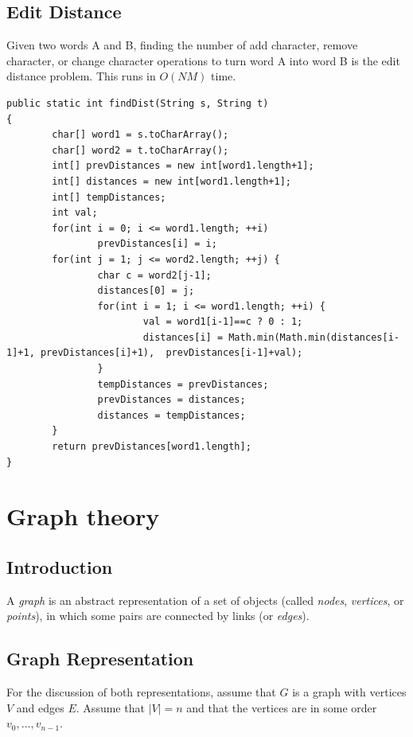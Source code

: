 \documentclass[a4paper,12pt]{article}
\begin{document}
\subsection{Edit Distance}

Given two words A and B, finding the number of add character, remove character, or change character operations to turn word A into word B is the edit distance problem. This runs in $O(NM)$ time.

\begin{lstlisting}
public static int findDist(String s, String t) 
{                
        char[] word1 = s.toCharArray();
        char[] word2 = t.toCharArray();
        int[] prevDistances = new int[word1.length+1];
        int[] distances = new int[word1.length+1];
        int[] tempDistances;
        int val;
        for(int i = 0; i <= word1.length; ++i) 
                prevDistances[i] = i;
        for(int j = 1; j <= word2.length; ++j) {
                char c = word2[j-1];
                distances[0] = j;
                for(int i = 1; i <= word1.length; ++i) {
                        val = word1[i-1]==c ? 0 : 1;                            
                        distances[i] = Math.min(Math.min(distances[i-1]+1, prevDistances[i]+1),  prevDistances[i-1]+val);  
                }
                tempDistances = prevDistances;
                prevDistances = distances;
                distances = tempDistances;
        } 
        return prevDistances[word1.length];
}
\end{lstlisting}

\newpage\section{Graph theory}

\subsection{Introduction}

A {\em graph} is an abstract representation of a set of objects (called {\em nodes}, {\em vertices}, or {\em points}), in which some pairs are connected by links (or {\em edges}).

\subsection{Graph Representation}

For the discussion of both representations, assume that $G$ is a graph with vertices $V$ and edges $E$. Assume that $|V| = n$ and that the vertices are in some order $v_0, ..., v_{n-1}$. 
\end{document}
